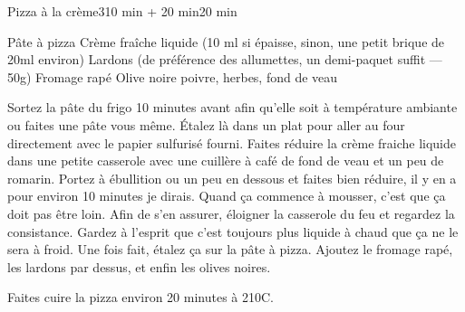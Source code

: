 \begin{recette}{Pizza à la crème}{3}{10 min + 20 min}{20 min}
\begin{ingredients}
\ingredient Pâte à pizza
\ingredient Crème fraîche liquide (10 ml si épaisse, sinon, une petit brique de 20ml environ)
\ingredient Lardons (de préférence des allumettes, un demi-paquet suffit --- 50g)
\ingredient Fromage rapé
\ingredient Olive noire
\ingredient poivre, herbes, fond de veau
\end{ingredients}

\begin{preparation}
\etape Sortez la pâte du frigo 10 minutes avant afin qu'elle soit à température ambiante ou faites une pâte vous même.
\etape Étalez là dans un plat pour aller au four directement avec le papier sulfurisé fourni.
\etape Faites réduire la crème fraiche liquide dans une petite casserole avec une cuillère à café de fond de veau et un peu de romarin. Portez à ébullition ou un peu en dessous et faites bien réduire, il y en a pour environ 10 minutes je dirais. Quand ça commence à mousser, c'est que ça doit pas être loin. Afin de s'en assurer, éloigner la casserole du feu et regardez la consistance. Gardez à l'esprit que c'est toujours plus liquide à chaud que ça ne le sera à froid.
\etape Une fois fait, étalez ça sur la pâte à pizza. Ajoutez le fromage rapé, les lardons par dessus, et enfin les olives noires.
\end{preparation}

\begin{cuisson}
Faites cuire la pizza environ 20 minutes à 210\degres C.
\end{cuisson}


\end{recette}

